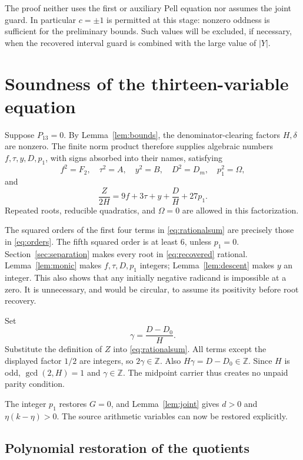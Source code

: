 \documentclass[11pt]{article}
\theoremstyle{definition}
\theoremstyle{remark}
\newcommand{\Z}{\mathbb Z}
\begin{document}
The proof neither uses the first or auxiliary Pell equation nor assumes
the joint guard. In particular \(c=\pm1\) is permitted at this stage:
nonzero oddness is sufficient for the preliminary bounds. Such values
will be excluded, if necessary, when the recovered interval guard is
combined with the large value of \(|Y|\).

\section{Soundness of the thirteen-variable equation}
\label{sec:soundness}

Suppose \(P_{13}=0\). By Lemma~\ref{lem:bounds}, the denominator-clearing
factors \(H,\delta\) are nonzero. The finite norm product therefore
supplies algebraic numbers \(f,\tau,y,D,p_1\), with signs absorbed into
their names, satisfying
\begin{equation}
 f^2=F_2,\quad \tau^2=A,\quad y^2=B,\quad
 D^2=D_m,\quad p_1^2=\Omega,
 \label{eq:recovered}
\end{equation}
and
\begin{equation}
 \frac{Z}{2H}=9f+3\tau+y+\frac{D}{H}+27p_1.
 \label{eq:rationalsum}
\end{equation}
Repeated roots, reducible quadratics, and \(\Omega=0\) are allowed in this
factorization.

The squared orders of the first four terms in
\eqref{eq:rationalsum} are precisely those in \eqref{eq:orders}.
The fifth squared order is at least \(6\), unless \(p_1=0\).
Section~\ref{sec:separation} makes every root in
\eqref{eq:recovered} rational. Lemma~\ref{lem:monic} makes
\(f,\tau,D,p_1\) integers; Lemma~\ref{lem:descent} makes \(y\) an integer.
This also shows that any initially negative radicand is impossible at a
zero. It is unnecessary, and would be circular, to assume its positivity
before root recovery.

Set
\[
 \gamma=\frac{D-D_0}{H}.
\]
Substitute the definition of \(Z\) into \eqref{eq:rationalsum}. All terms
except the displayed factor \(1/2\) are integers, so \(2\gamma\in\Z\).
Also \(H\gamma=D-D_0\in\Z\). Since \(H\) is odd,
\(\gcd(2,H)=1\) and \(\gamma\in\Z\). The midpoint carrier thus creates no
unpaid parity condition.

The integer \(p_1\) restores \(G=0\), and
Lemma~\ref{lem:joint} gives \(d>0\) and
\(\eta(k-\eta)>0\). The source arithmetic variables can now be restored
explicitly.

\subsection{Polynomial restoration of the quotients}
\end{document}
